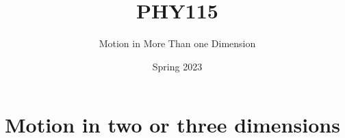 \documentclass[]{beamer}
\title{PHY115}    %
\author{Motion in More Than one Dimension}                 %
\institute{Digipen}      %
\date{Spring 2023}
\begin{document}
\begin{frame}
  \titlepage
\end{frame}

\section[]{}

\begin{frame}
  \tableofcontents
\end{frame}



\section{Motion in two or three dimensions}
\end{document}
